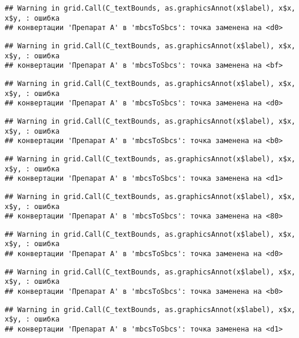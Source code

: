 \documentclass[
]{article}
\begin{document}
\begin{verbatim}
## Warning in grid.Call(C_textBounds, as.graphicsAnnot(x$label), x$x, x$y, : ошибка
## конвертации 'Препарат A' в 'mbcsToSbcs': точка заменена на <d0>
\end{verbatim}

\begin{verbatim}
## Warning in grid.Call(C_textBounds, as.graphicsAnnot(x$label), x$x, x$y, : ошибка
## конвертации 'Препарат A' в 'mbcsToSbcs': точка заменена на <bf>
\end{verbatim}

\begin{verbatim}
## Warning in grid.Call(C_textBounds, as.graphicsAnnot(x$label), x$x, x$y, : ошибка
## конвертации 'Препарат A' в 'mbcsToSbcs': точка заменена на <d0>
\end{verbatim}

\begin{verbatim}
## Warning in grid.Call(C_textBounds, as.graphicsAnnot(x$label), x$x, x$y, : ошибка
## конвертации 'Препарат A' в 'mbcsToSbcs': точка заменена на <b0>
\end{verbatim}

\begin{verbatim}
## Warning in grid.Call(C_textBounds, as.graphicsAnnot(x$label), x$x, x$y, : ошибка
## конвертации 'Препарат A' в 'mbcsToSbcs': точка заменена на <d1>
\end{verbatim}

\begin{verbatim}
## Warning in grid.Call(C_textBounds, as.graphicsAnnot(x$label), x$x, x$y, : ошибка
## конвертации 'Препарат A' в 'mbcsToSbcs': точка заменена на <80>
\end{verbatim}

\begin{verbatim}
## Warning in grid.Call(C_textBounds, as.graphicsAnnot(x$label), x$x, x$y, : ошибка
## конвертации 'Препарат A' в 'mbcsToSbcs': точка заменена на <d0>
\end{verbatim}

\begin{verbatim}
## Warning in grid.Call(C_textBounds, as.graphicsAnnot(x$label), x$x, x$y, : ошибка
## конвертации 'Препарат A' в 'mbcsToSbcs': точка заменена на <b0>
\end{verbatim}

\begin{verbatim}
## Warning in grid.Call(C_textBounds, as.graphicsAnnot(x$label), x$x, x$y, : ошибка
## конвертации 'Препарат A' в 'mbcsToSbcs': точка заменена на <d1>
\end{verbatim}
\end{document}
